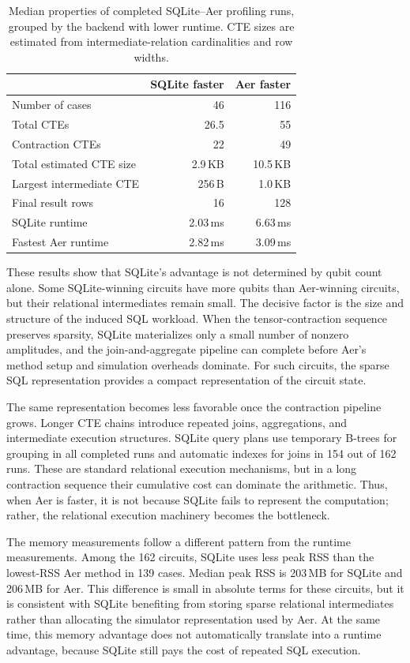 \begin{table}[t]
\centering
\small
\caption{Median properties of completed SQLite--Aer profiling runs, grouped by
the backend with lower runtime. CTE sizes are estimated from intermediate-relation
cardinalities and row widths.}
\label{tab:sqlite-aer-profile}
\begin{tabular}{lrr}
\toprule
 & SQLite faster & Aer faster \\
\midrule
Number of cases & 46 & 116 \\
Total CTEs & 26.5 & 55 \\
Contraction CTEs & 22 & 49 \\
Total estimated CTE size & 2.9\,KB & 10.5\,KB \\
Largest intermediate CTE & 256\,B & 1.0\,KB \\
Final result rows & 16 & 128 \\
SQLite runtime & 2.03\,ms & 6.63\,ms \\
Fastest Aer runtime & 2.82\,ms & 3.09\,ms \\
\bottomrule
\end{tabular}
\end{table}

These results show that SQLite's advantage is not determined by qubit count
alone. Some SQLite-winning circuits have more qubits than Aer-winning circuits,
but their relational intermediates remain small. The decisive factor is the size
and structure of the induced SQL workload. When the tensor-contraction sequence
preserves sparsity, SQLite materializes only a small number of nonzero amplitudes,
and the join-and-aggregate pipeline can complete before Aer's method setup and
simulation overheads dominate. For such circuits, the sparse SQL representation
provides a compact representation of the circuit state.

The same representation becomes less favorable once the contraction pipeline
grows. Longer CTE chains introduce repeated joins, aggregations, and intermediate
execution structures. SQLite query plans use temporary B-trees for grouping in
all completed runs and automatic indexes for joins in 154 out of 162 runs. These
are standard relational execution mechanisms, but in a long contraction sequence
their cumulative cost can dominate the arithmetic. Thus, when Aer is faster, it
is not because SQLite fails to represent the computation; rather, the relational
execution machinery becomes the bottleneck.

The memory measurements follow a different pattern from the runtime measurements.
Among the 162 circuits, SQLite uses less peak RSS than the lowest-RSS  
Aer method in 139 cases. Median peak RSS is 203\,MB for SQLite and 206\,MB for
Aer. This difference is small in absolute terms for these circuits, but it is
consistent with SQLite benefiting from storing sparse relational intermediates
rather than allocating the simulator representation used by Aer. At the same
time, this memory advantage does not automatically translate into a runtime
advantage, because SQLite still pays the cost of repeated SQL execution.

